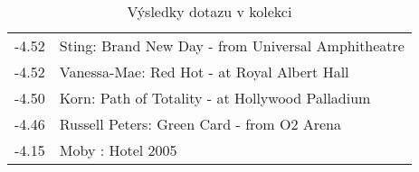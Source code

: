 \begin{table}[H]
\begin{tt}
\begin{minipage}[t]{.5\textwidth}
\begin{tabulary}{1.1\textwidth}{LL}
-4.52 & Sting:  Brand New Day  -  from  Universal Amphitheatre \\
-4.52 & Vanessa-Mae:  Red Hot  -  at  Royal Albert Hall \\
-4.50 & Korn:  Path of Totality  -  at  Hollywood Palladium \\
-4.46 & Russell Peters:  Green Card  -  from  O2 Arena \\
-4.15 & Moby :  Hotel  2005 \\
\end{tabulary}
\end{minipage}

\horizlina
\end{tt}

\caption{Výsledky dotazu  v kolekci }
\label{tab:result:the_live_tour}
\end{table}
